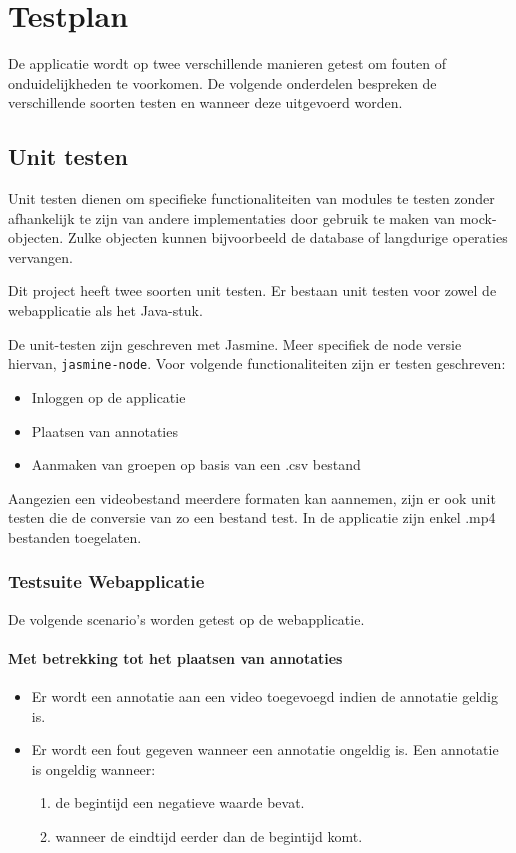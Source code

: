 \chapter{Testplan}
\label{ch:testplan}
De applicatie wordt op twee verschillende manieren getest om fouten of onduidelijkheden te voorkomen. De volgende onderdelen bespreken de verschillende soorten testen en wanneer deze uitgevoerd worden.

\section{Unit testen}
Unit testen dienen om specifieke functionaliteiten van modules te testen zonder afhankelijk te zijn van andere implementaties door gebruik te maken van mock-objecten. Zulke objecten kunnen bijvoorbeeld de database of langdurige operaties vervangen. 
\newline

Dit project heeft twee soorten unit testen. Er bestaan unit testen voor zowel de webapplicatie als het Java-stuk.

De unit-testen zijn geschreven met Jasmine. Meer specifiek de node versie hiervan, \texttt{jasmine-node}. Voor volgende functionaliteiten zijn er testen geschreven:
\begin{itemize}
 \item Inloggen op de applicatie
 \item Plaatsen van annotaties
 \item Aanmaken van groepen op basis van een .csv bestand
\end{itemize}


Aangezien een videobestand meerdere formaten kan aannemen, zijn er ook unit testen die de conversie van zo een bestand test. In de applicatie zijn enkel .mp4 bestanden toegelaten.
\newline

\subsection{Testsuite Webapplicatie}
De volgende scenario's worden getest op de webapplicatie.
\subsubsection{Met betrekking tot het plaatsen van annotaties}
\begin{itemize}
 \item Er wordt een annotatie aan een video toegevoegd indien de annotatie geldig is.
 \item Er wordt een fout gegeven wanneer een annotatie ongeldig is. Een annotatie is ongeldig wanneer: 
    \begin{enumerate}
      \item de begintijd een negatieve waarde bevat.
      \item wanneer de eindtijd eerder dan de begintijd komt.
    \end{enumerate}
\end{itemize}
